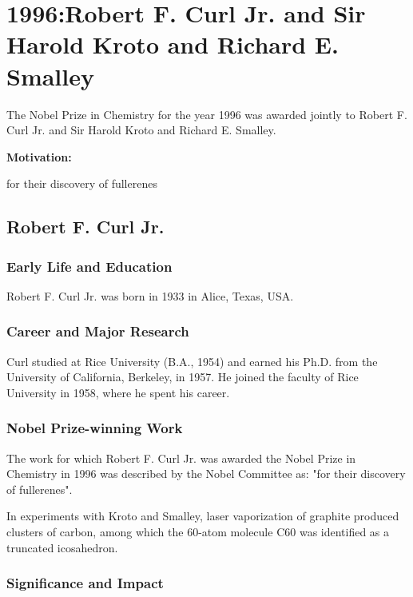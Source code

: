 \chapter{1996:Robert F. Curl Jr. and Sir Harold Kroto and Richard E. Smalley}

\label{chap:chemistry1996}

The Nobel Prize in Chemistry for the year 1996 was awarded jointly to Robert F. Curl Jr. and Sir Harold Kroto and Richard E. Smalley.

\textbf{Motivation:}

for their discovery of fullerenes

\section{Robert F. Curl Jr.}

\subsection*{Early Life and Education}

Robert F. Curl Jr. was born in 1933 in Alice, Texas, USA.

\subsection*{Career and Major Research}

Curl studied at Rice University (B.A., 1954) and earned his Ph.D. from the University of California, Berkeley, in 1957. He joined the faculty of Rice University in 1958, where he spent his career.

\subsection*{Nobel Prize-winning Work}

The work for which Robert F. Curl Jr. was awarded the Nobel Prize in Chemistry in 1996 was described by the Nobel Committee as: "for their discovery of fullerenes".

In experiments with Kroto and Smalley, laser vaporization of graphite produced clusters of carbon, among which the 60-atom molecule C60 was identified as a truncated icosahedron.

\subsection*{Significance and Impact}

